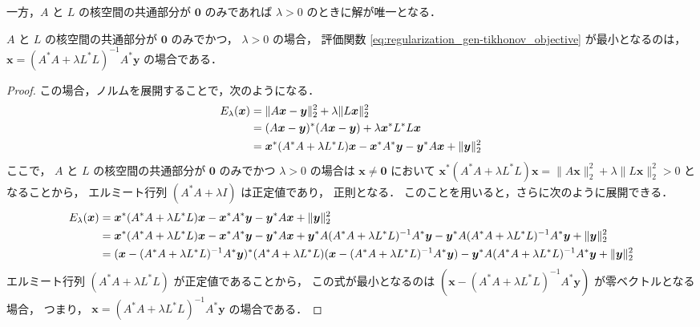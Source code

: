一方，$A$ と $L$ の核空間の共通部分が $\bm{0}$ のみであれば
$\lambda > 0$ のときに解が唯一となる．

\begin{theorem}\label{theorem:regularization_gen-tikhonov_solution}
    $A$ と $L$ の核空間の共通部分が $\bm{0}$ のみでかつ，
    $\lambda > 0$ の場合，
    評価関数 \eqref{eq:regularization_gen-tikhonov_objective} が最小となるのは，
    $\bm{x} = (A^* A + \lambda L^* L)^{-1} A^* \bm{y}$ の場合である．
\end{theorem}
\begin{proof}
    この場合，ノルムを展開することで，次のようになる．
    \begin{align}
        E_{\lambda}(\bm{x})
         & = \|A \bm{x} - \bm{y}\|_2^2 + \lambda \|L \bm{x}\|_2^2
        \notag                                                                                                  \\
         & = (A \bm{x} - \bm{y})^* (A \bm{x} - \bm{y}) + \lambda \bm{x}^* L^* L \bm{x}
        \notag                                                                                                  \\
         & = \bm{x}^* (A^* A + \lambda L^* L) \bm{x} - \bm{x}^* A^* \bm{y} - \bm{y}^* A \bm{x} + \|\bm{y}\|_2^2
    \end{align}
    ここで，
    $A$ と $L$ の核空間の共通部分が $\bm{0}$ のみでかつ
    $\lambda > 0$ の場合は
    $\bm{x} \neq \bm{0}$ において
    $\bm{x}^* (A^* A + \lambda L^* L) \bm{x} = \|A \bm{x}\|_2^2 + \lambda \|L \bm{x}\|_2^2 > 0$
    となることから，
    エルミート行列 $(A^* A + \lambda I)$ は正定値であり，
    正則となる．
    このことを用いると，さらに次のように展開できる．
    \begin{align}
        E_{\lambda}(\bm{x})
         & = \bm{x}^* (A^* A + \lambda L^* L) \bm{x} - \bm{x}^* A^* \bm{y} - \bm{y}^* A \bm{x} + \|\bm{y}\|_2^2
        \notag                                                                                                  \\
         & = \bm{x}^* (A^* A + \lambda L^* L) \bm{x} - \bm{x}^* A^* \bm{y} - \bm{y}^* A \bm{x}
        + \bm{y}^* A (A^* A + \lambda L^* L)^{-1} A^* \bm{y}
        - \bm{y}^* A (A^* A + \lambda L^* L)^{-1} A^* \bm{y}
        + \|\bm{y}\|_2^2
        \notag                                                                                                  \\
         & = (\bm{x} - (A^* A + \lambda L^* L)^{-1} A^* \bm{y})^*
        (A^* A + \lambda L^* L)
        (\bm{x} - (A^* A + \lambda L^* L)^{-1} A^* \bm{y})
        - \bm{y}^* A (A^* A + \lambda L^* L)^{-1} A^* \bm{y}
        + \|\bm{y}\|_2^2
    \end{align}
    エルミート行列 $(A^* A + \lambda L^* L)$ が正定値であることから，
    この式が最小となるのは
    $(\bm{x} - (A^* A + \lambda L^* L)^{-1} A^* \bm{y})$
    が零ベクトルとなる場合，
    つまり，
    $\bm{x} = (A^* A + \lambda L^* L)^{-1} A^* \bm{y}$
    の場合である．
\end{proof}

